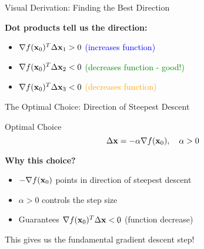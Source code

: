 \documentclass[usenames,dvipsnames]{beamer}
\begin{document}
  \begin{frame}{Visual Derivation: Finding the Best Direction}
    \begin{center}
    \end{center}
    
    \pause
    \textbf{Dot products tell us the direction:}
    \begin{itemize}
        \item $\nabla f(\mathbf{x}_0)^T \Delta \mathbf{x}_1 > 0$ \textcolor{blue}{(increases function)}
        \item $\nabla f(\mathbf{x}_0)^T \Delta \mathbf{x}_2 < 0$ \textcolor{green}{(decreases function - good!)}
        \item $\nabla f(\mathbf{x}_0)^T \Delta \mathbf{x}_3 < 0$ \textcolor{orange}{(decreases function)}
    \end{itemize}
    
  \end{frame}

  \begin{frame}{The Optimal Choice: Direction of Steepest Descent}
    \begin{definitionbox}{Optimal Choice}
    $$\Delta \mathbf{x} = -\alpha \nabla f(\mathbf{x}_0), \quad \alpha > 0$$
    \end{definitionbox}
    
    \pause
    \textbf{Why this choice?}
    \begin{itemize}[<+->]
        \item $-\nabla f(\mathbf{x}_0)$ points in direction of steepest descent
        \item $\alpha > 0$ controls the step size
        \item Guarantees $\nabla f(\mathbf{x}_0)^T \Delta\mathbf{x} < 0$ (function decrease)
    \end{itemize}
    
    \pause
    \begin{keypointsbox}{}
    This gives us the fundamental gradient descent step!
    \end{keypointsbox}
  \end{frame}
\end{document}
